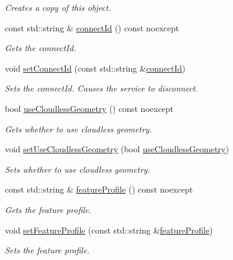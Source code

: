 \begin{DoxyCompactItemize}
\begin{DoxyCompactList}\small\item\em Creates a copy of this object. \end{DoxyCompactList}\item 
const std\+::string \& \hyperlink{classdg_1_1deepcore_1_1imagery_1_1_dg_wmts_client_aaa23928355c68c5422a5aab297d64f99}{connect\+Id} () const noexcept
\begin{DoxyCompactList}\small\item\em Gets the connect\+Id. \end{DoxyCompactList}\item 
void \hyperlink{classdg_1_1deepcore_1_1imagery_1_1_dg_wmts_client_aa7e7d9c316fc59ccbe6a30596389a3da}{set\+Connect\+Id} (const std\+::string \&\hyperlink{classdg_1_1deepcore_1_1imagery_1_1_dg_wmts_client_aaa23928355c68c5422a5aab297d64f99}{connect\+Id})
\begin{DoxyCompactList}\small\item\em Sets the connect\+Id. Causes the service to disconnect. \end{DoxyCompactList}\item 
bool \hyperlink{classdg_1_1deepcore_1_1imagery_1_1_dg_wmts_client_a718ef987832eb1d5bbab510c6ef7b70c}{use\+Cloudless\+Geometry} () const noexcept
\begin{DoxyCompactList}\small\item\em Gets whether to use cloudless geometry. \end{DoxyCompactList}\item 
void \hyperlink{classdg_1_1deepcore_1_1imagery_1_1_dg_wmts_client_ab517b9f4668bc619e790455cd5111cff}{set\+Use\+Cloudless\+Geometry} (bool \hyperlink{classdg_1_1deepcore_1_1imagery_1_1_dg_wmts_client_a718ef987832eb1d5bbab510c6ef7b70c}{use\+Cloudless\+Geometry})
\begin{DoxyCompactList}\small\item\em Sets whether to use cloudless geometry. \end{DoxyCompactList}\item 
const std\+::string \& \hyperlink{classdg_1_1deepcore_1_1imagery_1_1_dg_wmts_client_a70e018e8832c4c32a0089074cd1d0adb}{feature\+Profile} () const noexcept
\begin{DoxyCompactList}\small\item\em Gets the feature profile. \end{DoxyCompactList}\item 
void \hyperlink{classdg_1_1deepcore_1_1imagery_1_1_dg_wmts_client_a77b7384edff50a3f9f1fdb46319cb4ec}{set\+Feature\+Profile} (const std\+::string \&\hyperlink{classdg_1_1deepcore_1_1imagery_1_1_dg_wmts_client_a70e018e8832c4c32a0089074cd1d0adb}{feature\+Profile})
\begin{DoxyCompactList}\small\item\em Sets the feature profile. \end{DoxyCompactList}\end{DoxyCompactItemize}
